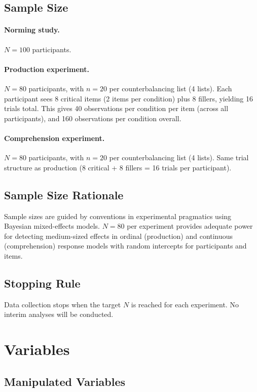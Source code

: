 \documentclass[12pt]{article}
\begin{document}
\subsection{Sample Size}

\paragraph{Norming study.} $N = 100$ participants.

\paragraph{Production experiment.} $N = 80$ participants, with $n = 20$ per counterbalancing list (4 lists). Each participant sees 8 critical items (2 items per condition) plus 8 fillers, yielding 16 trials total. This gives 40 observations per condition per item (across all participants), and 160 observations per condition overall.

\paragraph{Comprehension experiment.} $N = 80$ participants, with $n = 20$ per counterbalancing list (4 lists). Same trial structure as production (8 critical + 8 fillers = 16 trials per participant).

\subsection{Sample Size Rationale}
Sample sizes are guided by conventions in experimental pragmatics using Bayesian mixed-effects models. $N = 80$ per experiment provides adequate power for detecting medium-sized effects in ordinal (production) and continuous (comprehension) response models with random intercepts for participants and items.

\subsection{Stopping Rule}
Data collection stops when the target $N$ is reached for each experiment. No interim analyses will be conducted.


\section{Variables}

\subsection{Manipulated Variables}
\end{document}
